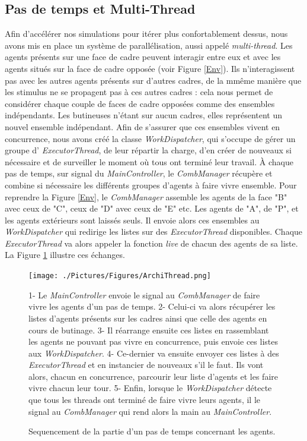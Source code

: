 			\subsection{Pas de temps et Multi-Thread}
			Afin d'accélérer nos simulations pour itérer plus confortablement dessus, nous avons mis en place un système de parallélisation, aussi appelé \textit{multi-thread}. Les agents présents sur une face de cadre peuvent interagir entre eux et avec les agents situés sur la face de cadre opposée (voir Figure \ref{Env}). Ils n'interagissent pas avec les autres agents présents sur d'autres cadres, de la mmême manière que les stimulus ne se propagent pas à ces autres cadres : cela nous permet de considérer chaque couple de faces de cadre opposées comme des ensembles indépendants. Les butineuses n'étant sur aucun cadres, elles représentent un nouvel ensemble indépendant. Afin de s'assurer que ces ensembles vivent en concurrence, nous avons créé la classe \textit{WorkDispatcher}, qui s'occupe de gérer un groupe d' \textit{ExecutorThread}, de leur répartir la charge, d'en créer de nouveaux si nécessaire et de surveiller le moment où tous ont terminé leur travail. À chaque pas de temps, sur signal du \textit{MainController}, le \textit{CombManager} récupère et combine si nécessaire les différents groupes d'agents à faire vivre ensemble. Pour reprendre la Figure \ref{Env}, le \textit{CombManager} assemble les agents de la face "B" avec ceux de "C", ceux de "D" avec ceux de "E" etc. Les agents de "A", de "P", et les agents extérieurs sont laissés seuls. Il envoie alors ces ensembles au \textit{WorkDispatcher} qui redirige les listes sur des \textit{ExecutorThread} disponibles. Chaque \textit{ExecutorThread} va alors appeler la fonction \textit{live} de chacun des agents de sa liste. La Figure \ref{ArchiThread} illustre ces échanges.
			
			\begin{figure}
			\centering
			\texttt{[image: ./Pictures/Figures/ArchiThread.png]}
			\caption{Sequencement de la partie d'un pas de temps concernant les agents.}{1- Le \textit{MainController} envoie le signal au \textit{CombManager} de faire vivre les agents d'un pas de temps. 2- Celui-ci va alors récupérer les listes d'agents présents sur les cadres ainsi que celle des agents en cours de butinage. 3- Il réarrange ensuite ces listes en rassemblant les agents ne pouvant pas vivre en concurrence, puis envoie ces listes aux \textit{WorkDispatcher}. 4- Ce-dernier va ensuite envoyer ces listes à des \textit{ExecutorThread} et en instancier de nouveaux s'il le faut. Ils vont alors, chacun en concurrence, parcourir leur liste d'agents et les faire vivre chacun leur tour. 5- Enfin, lorsque le \textit{WorkDispatcher} détecte que tous les threads ont terminé de faire vivre leurs agents, il le signal au \textit{CombManager} qui rend alors la main au \textit{MainController}.}
			\label{ArchiThread}
			\end{figure}
			
